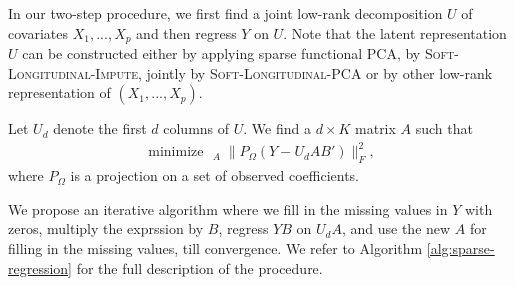 \documentclass[preprint]{imsart}
\numberwithin{equation}{section}
\theoremstyle{plain}
\newcommand{\tr}[1]{{\textcolor{red}{#1}}}
\DeclareMathOperator*{\argmin}{arg\,min}
\DeclareMathOperator*{\minimize}{minimize\ \ }
\begin{document}

In our two-step procedure, we first find a joint low-rank decomposition $U$ of covariates $X_1,...,X_p$ and then regress $Y$ on $U$. Note that the latent representation $U$ can be constructed either by applying sparse functional PCA, by \textsc{Soft-Longitudinal-Impute}, jointly by \textsc{Soft-Longitudinal-PCA} or by other low-rank representation of $(X_1,...,X_p)$.

Let $U_{d}$ denote the first $d$ columns of $U$. We find a $d \times K$ matrix $A$ such that
\begin{align}\label{eq:pcr}
\minimize_A \|P_\Omega(Y - U_dAB')\|_F^2,
\end{align}
where $P_\Omega$ is a projection on a set of observed coefficients.

We propose an iterative algorithm where we fill in the missing values in $Y$ with zeros, multiply the exprssion by $B$, regress $YB$ on $U_dA$, and use the new $A$ for filling in the missing values, till convergence. We refer to Algorithm \ref{alg:sparse-regression} for the full description of the procedure.



\end{document}
